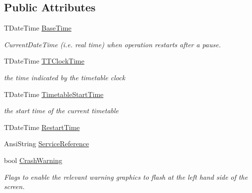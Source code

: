 \subsection*{Public Attributes}
\begin{DoxyCompactItemize}
\item 
\mbox{\label{class_t_train_controller_a8c574abde256f87d43b7cce8b9024fd9}} 
T\+Date\+Time \mbox{\hyperlink{class_t_train_controller_a8c574abde256f87d43b7cce8b9024fd9}{Base\+Time}}
\begin{DoxyCompactList}\small\item\em Current\+Date\+Time (i.\+e. real time) when operation restarts after a pause. \end{DoxyCompactList}\item 
\mbox{\label{class_t_train_controller_a0c0b9d01dd9e1515017b629ebf1a98f1}} 
T\+Date\+Time \mbox{\hyperlink{class_t_train_controller_a0c0b9d01dd9e1515017b629ebf1a98f1}{T\+T\+Clock\+Time}}
\begin{DoxyCompactList}\small\item\em the time indicated by the timetable clock \end{DoxyCompactList}\item 
\mbox{\label{class_t_train_controller_a3df0fb217914cd6d38db7dd2daf1de7a}} 
T\+Date\+Time \mbox{\hyperlink{class_t_train_controller_a3df0fb217914cd6d38db7dd2daf1de7a}{Timetable\+Start\+Time}}
\begin{DoxyCompactList}\small\item\em the start time of the current timetable \end{DoxyCompactList}\item 
T\+Date\+Time \mbox{\hyperlink{class_t_train_controller_a7d7dc55374ee043f1045b1d4ff91853f}{Restart\+Time}}
\item 
Ansi\+String \mbox{\hyperlink{class_t_train_controller_a1b103ff111456f178286d97002b63afb}{Service\+Reference}}
\item 
\mbox{\label{class_t_train_controller_a1d9bbe67bb4b3e68896f0a0325dfb883}} 
bool \mbox{\hyperlink{class_t_train_controller_a1d9bbe67bb4b3e68896f0a0325dfb883}{Crash\+Warning}}
\begin{DoxyCompactList}\small\item\em Flags to enable the relevant warning graphics to flash at the left hand side of the screen. \end{DoxyCompactList}\item 

\end{DoxyCompactItemize}
